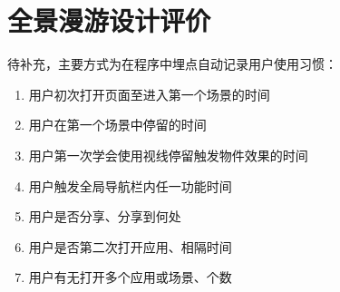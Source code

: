 \chapter{全景漫游设计评价}

待补充，主要方式为在程序中埋点自动记录用户使用习惯：
\begin{enumerate}
	\item 用户初次打开页面至进入第一个场景的时间
	\item 用户在第一个场景中停留的时间
	\item 用户第一次学会使用视线停留触发物件效果的时间
	\item 用户触发全局导航栏内任一功能时间
	\item 用户是否分享、分享到何处
    \item 用户是否第二次打开应用、相隔时间
    \item 用户有无打开多个应用或场景、个数
\end{enumerate}

